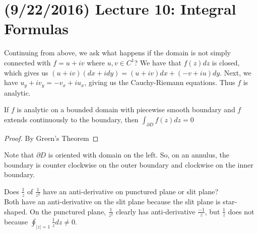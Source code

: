 \documentclass[11pt,leqno,oneside]{amsart}
\numberwithin{thm}{section}
\begin{document}
  \section{(9/22/2016) Lecture 10: Integral Formulas}
  Continuing from above, we ask what happens if the domain is not
  simply connected with $f = u+iv$ where $u,v \in C^1$? We have that
  $f(z)dz$ is closed, which gives us $(u+iv)(dx+idy) =
  (u+iv)dx+(-v+iu)dy$. Next, we have $u_y+iv_y = -v_x+iu_x$, giving us
  the Cauchy-Riemann equations. Thus $f$ is analytic.
  \begin{thm}
    If $f$ is analytic on a bounded domain with piecewise smooth
    boundary and $f$ extends continuously to the boundary, then
    $\int_{\partial D} f(z)dz = 0$
  \end{thm}
  \begin{proof}
    By Green's Theorem
  \end{proof}
  Note that $\partial D$ is oriented with domain on the left. So, on
  an annulus, the boundary is counter clockwise on the outer boundary
  and clockwise on the inner boundary.
  \begin{example}
    Does $\frac{1}{z}$ of $\frac{1}{z^2}$ have an anti-derivative on
    punctured plane or slit plane? \\

    Both have an anti-derivative on the slit plane because the slit
    plane is star-shaped. On the punctured plane, $\frac{1}{z^2}$
    clearly has anti-derivative $\frac{-1}{z}$, but $\frac{1}{z}$ does
    not because $\oint_{|z|=1} \frac{1}{z}dz \neq 0$.
  \end{example}
\end{document}
